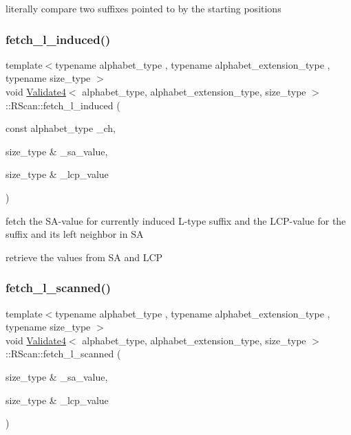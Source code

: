 literally compare two suffixes pointed to by the starting positions 

\mbox{\label{struct_validate4_1_1_r_scan_aaa6c6e347bff1c6cb663771646c41826}} 
\subsubsection{\texorpdfstring{fetch\+\_\+l\+\_\+induced()}{fetch\_l\_induced()}}
{\footnotesize\ttfamily template$<$typename alphabet\+\_\+type , typename alphabet\+\_\+extension\+\_\+type , typename size\+\_\+type $>$ \\
void \hyperlink{class_validate4}{Validate4}$<$ alphabet\+\_\+type, alphabet\+\_\+extension\+\_\+type, size\+\_\+type $>$\+::R\+Scan\+::fetch\+\_\+l\+\_\+induced (\begin{DoxyParamCaption}\item[{const alphabet\+\_\+type}]{\+\_\+ch,  }\item[{size\+\_\+type \&}]{\+\_\+sa\+\_\+value,  }\item[{size\+\_\+type \&}]{\+\_\+lcp\+\_\+value }\end{DoxyParamCaption})\hspace{0.3cm}{\ttfamily [inline]}}



fetch the S\+A-\/value for currently induced L-\/type suffix and the L\+C\+P-\/value for the suffix and its left neighbor in SA 

retrieve the values from SA and L\+CP \mbox{\label{struct_validate4_1_1_r_scan_af88a27e36780a6b390bc0bd18c253429}} 
\subsubsection{\texorpdfstring{fetch\+\_\+l\+\_\+scanned()}{fetch\_l\_scanned()}}
{\footnotesize\ttfamily template$<$typename alphabet\+\_\+type , typename alphabet\+\_\+extension\+\_\+type , typename size\+\_\+type $>$ \\
void \hyperlink{class_validate4}{Validate4}$<$ alphabet\+\_\+type, alphabet\+\_\+extension\+\_\+type, size\+\_\+type $>$\+::R\+Scan\+::fetch\+\_\+l\+\_\+scanned (\begin{DoxyParamCaption}\item[{size\+\_\+type \&}]{\+\_\+sa\+\_\+value,  }\item[{size\+\_\+type \&}]{\+\_\+lcp\+\_\+value }\end{DoxyParamCaption})\hspace{0.3cm}{\ttfamily [inline]}}



